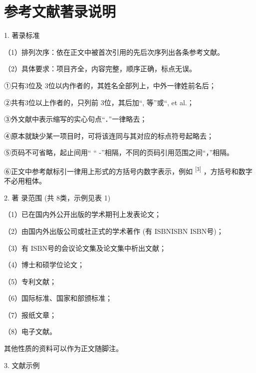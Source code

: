 \documentclass{ctexart}
\begin{document}
\section{参考文献著录说明}

1. 著录标准

（1）排列次序：依在正文中被首次引用的先后次序列出各条参考文献。

（2）具体要求：项目齐全，内容完整，顺序正确，标点无误。

①只有3位及 3位以内作者的，其姓名全部列上，中外一律姓前名后；

②共有3位以上作者的，只列前 3位，其后加“, 等”或“, et al.；

③外文献中表示缩写的实心句点“．”一律略去；

④原本就缺少某一项目时，可将该连同与其对应的标点符号起略去；

⑤页码不可省略，起止间用“ “ -”相隔，不同的页码引用范围之间“，”相隔。

⑥正文中参考献标引一律用上形式的方括号内数字表示，例如\textsuperscript{ [3] }，方括号和数字不必用粗体。

2. 著 录范围 (共 8类，示例见表 1)

（1）已在国内外公开出版的学术期刊上发表论文；

（2）由国内外出版公司或社正式的学术著作 (有 ISBNISBN ISBN号)；

（3）有 ISBN号的会议论文集及论文集中析出文献；

（4）博士和硕学位论文；

（5）专利文献；

（6）国际标准、国家和部颁标准；

（7）报纸文章；

（8）电子文献。

其他性质的资料可以作为正文随脚注。

3. 文献示例
\end{document}
